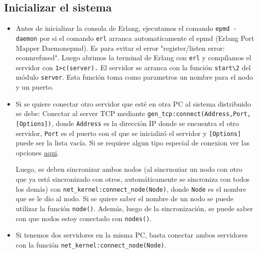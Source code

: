 \documentclass[a4paper]{article}
\newcommand{\blacktr}[0]{\item[$\blacktriangleright$]}
\begin{document}
\subsection*{Inicializar el sistema}
\begin{itemize}
    \blacktr Antes de inicializar la consola de Erlang, ejecutamos el comando \texttt{\textdollar epmd -daemon} por si el comando \texttt{\textdollar erl} arranca automaticamente el epmd (Erlang  Port  Mapper  Daemonepmd). Es para evitar el error "register/listen error: econnrefused". Luego abrimos la terminal de Erlang con \texttt{\textdollar erl} y compilamos el servidor con \texttt{1\textgreater c(server).} El servidor se arranca con la función \texttt{start\textbackslash2} del módulo \texttt{server}. Esta función toma como parametros un nombre para el nodo y un puerto. 

    \blacktr Si se quiere conectar otro servidor que esté en otra PC al sistema distribuido se debe:
      Conectar al server TCP mediante \texttt{gen_tcp:connect(Address,Port,[Options])}, donde \texttt{Address} es la dirección IP donde se encuentra el otro servidor, \texttt{Port} es el puerto con el que se inicializó el servidor y \texttt{[Options]} puede ser la lista vacía. Si se requiere algun tipo especial de conexion ver las opciones \href{http://erlang.org/doc/man/gen_tcp.html#connect-3}{aqui}.

      Luego, se deben sincronizar ambos nodos (al sincrnoziar un nodo con otro que ya está sincronizado con otros, automáticamente se sincroniza con todos los demás) con \texttt{net_kernel:connect_node(Node)}, donde \texttt{Node} es el nombre que se le dio al nodo. Si se quiere saber el nombre de un nodo se puede utilizar la función \texttt{node()}. Además, luego de la sincronización, se puede saber con que nodos estoy conectado con \texttt{nodes()}.

    \blacktr Si tenemos dos servidores en la misma PC, basta conectar ambos servidores con la función \texttt{net_kernel:connect_node(Node)}.
\end{itemize}
\end{document}
